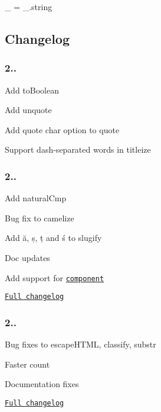 \begin{DoxyCode}
\_ = \_.string
\end{DoxyCode}


\subsection*{Changelog}

\subsubsection*{2..}


\begin{DoxyItemize}
\item Add {\ttfamily to\+Boolean}
\item Add {\ttfamily unquote}
\item Add quote char option to {\ttfamily quote}
\item Support dash-\/separated words in {\ttfamily titleize}
\end{DoxyItemize}

\subsubsection*{2..}


\begin{DoxyItemize}
\item Add {\ttfamily natural\+Cmp}
\item Bug fix to {\ttfamily camelize}
\item Add ă, ș, ț and ś to {\ttfamily slugify}
\item Doc updates
\item Add support for \href{http://component.io/}{\tt component}
\item \href{https://github.com/epeli/underscore.string/compare/v2.3.1...v2.3.2}{\tt Full changelog}
\end{DoxyItemize}

\subsubsection*{2..}


\begin{DoxyItemize}
\item Bug fixes to {\ttfamily escape\+H\+T\+ML}, {\ttfamily classify}, {\ttfamily substr}
\item Faster {\ttfamily count}
\item Documentation fixes
\item \href{https://github.com/epeli/underscore.string/compare/v2.3.0...v2.3.1}{\tt Full changelog}
\end{DoxyItemize}

